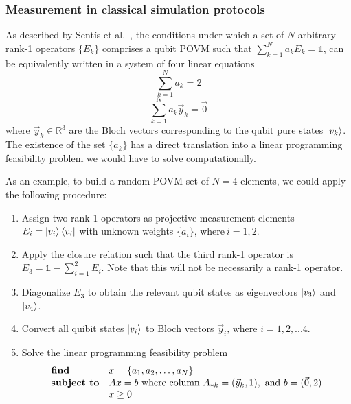 \subsubsection{Measurement in classical simulation protocols}
As described by Sent\'is et al.\ \cite{sentis2013}, the conditions under which a set of $N$ arbitrary rank-1 operators $\{E_{k}\}$ comprises a qubit POVM such that $\sum_{k=1}^{N} a_{k} E_{k} = \mathbb{1}$, can be equivalently written in a system of four linear equations
\begin{equation}
    \sum_{k=1}^{N} a_{k} = 2
\end{equation}
\begin{equation}
    \sum_{k=1}^{N} a_{k} \vec{y}_{k} = \vec{0}
\end{equation}
where $\vec{y}_{k} \in \mathbb{R}^3$ are the Bloch vectors corresponding to the qubit pure states $\ket{v_{k}}$. The existence of the set $\{a_{k}\}$ has a direct translation into a linear programming feasibility problem we would have to solve computationally.

As an example, to build a random POVM set of $N=4$ elements, we could apply the following procedure:
\begin{enumerate}
\item Assign two rank-1 operators as projective measurement elements $E_i = \ket{v_i}\bra{v_i}$ with unknown weights $\{a_i\} \text{, where}\ i=1,2$.
\item Apply the closure relation such that the third rank-1 operator is $E_3 = \mathbb{1} - \sum_{i=1}^{2}E_i$. Note that this will not be necessarily a rank-1 operator.
\item Diagonalize $E_3$ to obtain the relevant qubit states as eigenvectors $\ket{v_3}$ and $\ket{v_4}$.
\item Convert all quibit states $\ket{v_i}$ to Bloch vectors $\vec{y}_i \text{, where } i=1,2,...4$.
\item Solve the linear programming feasibility problem
\begin{equation*}
\begin{array}{ll@{}ll}
\textbf{find}  & x = \{a_1, a_2,\dots,a_N\} &\\
\textbf{subject to}& Ax = b\ \text{where column} \ A_{*k} = (\vec{y}_k, 1),\ \text{and}\ b = (\vec{0}, 2) \\
                 & x \geq 0 
\end{array}
\end{equation*}
\end{enumerate}

